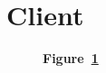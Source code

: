 \section{Client}\label{sec:client}

\begin{landscape}
	\begin{figure}[!h]
		\caption*{\textbf{Figure~\ref{fig:client}}}
		\captionlistentry{}\label{fig:client}
	\end{figure}
\end{landscape}
